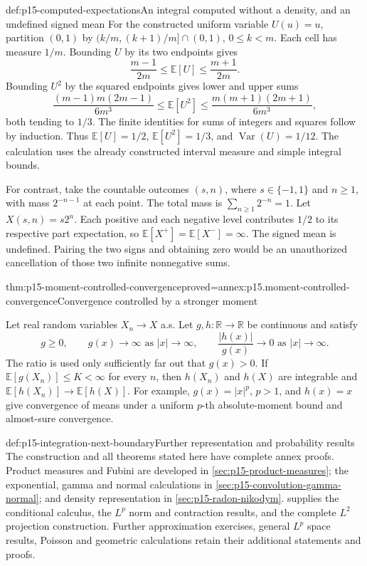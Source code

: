 \begin{hbexample}{def:p15-computed-expectations}{An integral computed without a density, and an undefined signed mean}
For the constructed uniform variable \(U(u)=u\), partition \((0,1)\)
by \((k/m,(k+1)/m]\cap(0,1)\), \(0\leq k<m\). Each cell has
measure \(1/m\). Bounding \(U\) by its two endpoints gives
\[
 \frac{m-1}{2m}\leq\mathbb E[U]\leq\frac{m+1}{2m}.
\]
Bounding \(U^2\) by the squared endpoints gives lower and upper sums
\[
 \frac{(m-1)m(2m-1)}{6m^3}
 \leq\mathbb E[U^2]\leq
 \frac{m(m+1)(2m+1)}{6m^3},
\]
both tending to \(1/3\).
The finite identities for sums of integers and squares follow by induction.
Thus \(\mathbb E[U]=1/2\), \(\mathbb E[U^2]=1/3\), and
\(\operatorname{Var}(U)=1/12\). The calculation uses the already
constructed interval measure and simple integral bounds.

For contrast, take the countable outcomes \((s,n)\), where
\(s\in\{-1,1\}\) and \(n\geq1\), with mass \(2^{-n-1}\)
at each point. The total mass is \(\sum_{n\geq1}2^{-n}=1\).
Let \(X(s,n)=s2^n\). Each positive and each negative level contributes
\(1/2\) to its respective part expectation, so
\(\mathbb E[X^+]=\mathbb E[X^-]=\infty\). The signed mean is
undefined. Pairing the two signs and obtaining zero would be an
unauthorized cancellation of those two infinite nonnegative sums.
\end{hbexample}

\begin{hbtheorem}{thm:p15-moment-controlled-convergence}{proved=annex:p15.moment-controlled-convergence}{Convergence controlled by a stronger moment}
\par\nobreak
Let real random variables \(X_n\to X\) a.s. Let
\(g,h:\mathbb R\to\mathbb R\) be continuous and satisfy
\[
 g\geq0,\qquad g(x)\to\infty\text{ as }|x|\to\infty,\qquad
 \frac{|h(x)|}{g(x)}\to0\text{ as }|x|\to\infty.
\]
The ratio is used only sufficiently far out that \(g(x)>0\).
If \(\mathbb E[g(X_n)]\leq K<\infty\) for every \(n\), then
\(h(X_n)\) and \(h(X)\) are integrable and
\(\mathbb E[h(X_n)]\to\mathbb E[h(X)]\).
For example, \(g(x)=|x|^p\), \(p>1\), and \(h(x)=x\) give
convergence of means under a uniform \(p\)-th absolute-moment bound
and almost-sure convergence.
\end{hbtheorem}

\begin{proofboundary}{def:p15-integration-next-boundary}{Further representation and probability results}
The construction and all theorems stated here have complete annex proofs.
Product measures and Fubini are developed in \cref{sec:p15-product-measures};
the exponential, gamma and normal calculations in
\cref{sec:p15-convolution-gamma-normal}; and density representation in
\cref{sec:p15-radon-nikodym}.
 supplies the conditional calculus,
the \(L^p\) norm and contraction results, and the complete \(L^2\)
projection construction. Further approximation exercises, general
\(L^p\) space results, Poisson and geometric calculations retain their
additional statements and proofs.
\end{proofboundary}
